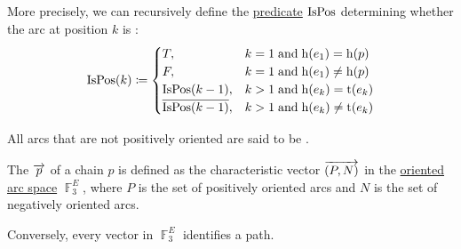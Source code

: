 \begin{definition}
\begin{thmenum}
    More precisely, we can recursively define the \hyperref[def:boolean_function]{predicate} \( \operatorname{IsPos} \) determining whether the arc at position \( k \) is :
    \begin{equation*}
      \begin{aligned}
        \op{IsPos}(k) \coloneqq \begin{cases}
          T,                            &k = 1 \T{and} \head(e_1) = \head(p) \\
          F,                            &k = 1 \T{and} \head(e_1) \neq \head(p) \\
          \op{IsPos}(k - 1),            &k > 1 \T{and} \head(e_k) = \tail(e_k) \\
          \overline{\op{IsPos}(k - 1)}, &k > 1 \T{and} \head(e_k) \neq \tail(e_k)
        \end{cases}
      \end{aligned}
    \end{equation*}

    All arcs that are not positively oriented are said to be .

     The  \( \overrightarrow{p} \) of a chain \( p \) is defined as the characteristic vector \( \overrightarrow{(P, N)} \) in the \hyperref[def:graph_spaces/oriented_arc]{oriented arc space} \( \BbbF_3^E \), where \( P \) is the set of positively oriented arcs and \( N \) is the set of negatively oriented arcs.

    Conversely, every vector in \( \BbbF_3^E \) identifies a path.
  \end{thmenum}
\end{definition}


